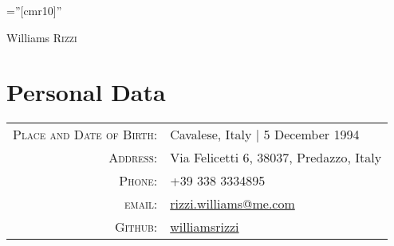 \documentclass[a4paper,10pt]{article}
\begin{document}

\pagestyle{empty} %

\font\fb=''[cmr10]'' %

\par{\centering
		{\Huge Williams \textsc{Rizzi}
	}\bigskip\par}

\section{Personal Data}

\begin{tabular}{rl}
    \textsc{Place and Date of Birth:} & Cavalese, Italy  | 5 December 1994 \\
    \textsc{Address:}   & Via Felicetti 6, 38037, Predazzo, Italy \\
    \textsc{Phone:}     & +39 338 3334895\\
    \textsc{email:}     & 
    \href{mailto:rizzi.williams@me.com}{rizzi.williams@me.com}\\
    \textsc{Github:}    & \href{https://github.com/WilliamsRizzi}{williamsrizzi}
\end{tabular}

\end{document}
